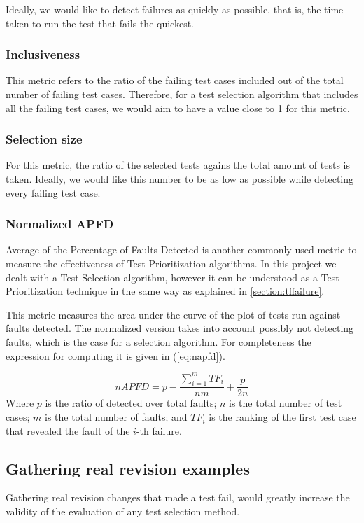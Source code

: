 \documentclass{article}
\begin{document}
Ideally, we would like to detect failures as quickly as possible, that is, the time taken to run the test that fails the quickest.
\subsubsection{Inclusiveness}
This metric refers to the ratio of the failing test cases included out of the total number of failing test cases. Therefore, for a test selection algorithm that includes all the failing test cases, we would aim to have a value close to 1 for this metric.
\subsubsection{Selection size}
For this metric, the ratio of the selected tests agains the total amount of tests is taken. Ideally, we would like this number to be as low as possible while detecting every failing test case.
\subsubsection{Normalized APFD}
Average of the Percentage of Faults Detected is another commonly used metric to measure the effectiveness of Test Prioritization algorithms. In this project we dealt with a Test Selection algorithm, however it can be understood as a Test Prioritization technique in the same way as explained in \ref{section:tffailure}.

This metric measures the area under the curve of the plot of tests run against faults detected. The normalized version takes into account possibly not detecting faults, which is the case for a selection algorithm. For completeness the expression for computing it is given in (\ref{eq:napfd}).

\begin{equation}
  \label{eq:napfd}
    nAPFD = p - \frac{\sum_{i=1}^{m}TF_i}{nm}+\frac{p}{2n}
\end{equation}
Where $p$ is the ratio of detected over total faults; $n$ is the total number of test cases; $m$ is the total number of faults; and $TF_i$ is the ranking of the first test case that revealed the fault of the $i$-th failure.


\subsection{Gathering real revision examples}
Gathering real revision changes that made a test fail, would greatly increase the validity of the evaluation of any test selection method.
\end{document}
